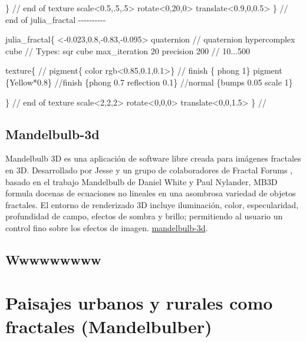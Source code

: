 \documentclass[
  11pt,
]{krantz}
\newenvironment{Shaded}{\begin{snugshade}}{\end{snugshade}}
\newcommand{\NormalTok}[1]{#1}
\theoremstyle{definition}
\theoremstyle{definition}
\theoremstyle{definition}
\theoremstyle{definition}
\theoremstyle{remark}
\begin{document}
\begin{Shaded}
\begin{Highlighting}[]
\NormalTok{   \} // end of texture}
\NormalTok{   scale\textless{}0.5,.5,.5\textgreater{}}
\NormalTok{   rotate\textless{}0,20,0\textgreater{}}
\NormalTok{   translate\textless{}0.9,0,0.5\textgreater{}}
\NormalTok{\} // end of julia\_fractal {-}{-}{-}{-}{-}{-}{-}{-}{-}{-}}

\NormalTok{    julia\_fractal\{ \textless{}{-}0.023,0.8,{-}0.83,{-}0.095\textgreater{}}
\NormalTok{   quaternion // quaternion hypercomplex}
\NormalTok{   cube             // Types: sqr  cube}
\NormalTok{   max\_iteration 20}
\NormalTok{   precision 200     // 10...500}

\NormalTok{   texture\{}
\NormalTok{  //   pigment\{ color rgb\textless{}0.85,0.1,0.1\textgreater{}\}}
\NormalTok{    // finish \{ phong 1\}}
\NormalTok{     pigment \{Yellow*0.8\}}
\NormalTok{     //finish \{phong 0.7 reflection 0.1\}}
\NormalTok{     //normal \{bumps 0.05 scale 1\}}

\NormalTok{   \} // end of texture}
\NormalTok{   scale\textless{}2,2,2\textgreater{}}
\NormalTok{   rotate\textless{}0,0,0\textgreater{}}
\NormalTok{   translate\textless{}0,0,1.5\textgreater{}}
\NormalTok{\} //}
\end{Highlighting}
\end{Shaded}

\hypertarget{mandelbulb-3d}{%
\subsection{Mandelbulb-3d}\label{mandelbulb-3d}}

Mandelbulb 3D es una aplicación de software libre creada para imágenes fractales en 3D. Desarrollado por Jesse y un grupo de colaboradores de Fractal Forums , basado en el trabajo Mandelbulb de Daniel White y Paul Nylander, MB3D formula docenas de ecuaciones no lineales en una asombrosa variedad de objetos fractales. El entorno de renderizado 3D incluye iluminación, color, especularidad, profundidad de campo, efectos de sombra y brillo; permitiendo al usuario un control fino sobre los efectos de imagen. \href{https://www.mandelbulb.com/2014/mandelbulb-3d-mb3d-fractal-rendering-software/}{mandelbulb-3d}.

\hypertarget{wwwwwwwww}{%
\subsection{Wwwwwwwww}\label{wwwwwwwww}}

\hypertarget{paisajes-urbanos-y-rurales-como-fractales-mandelbulber}{%
\section{Paisajes urbanos y rurales como fractales (Mandelbulber)}\label{paisajes-urbanos-y-rurales-como-fractales-mandelbulber}}
\end{document}
